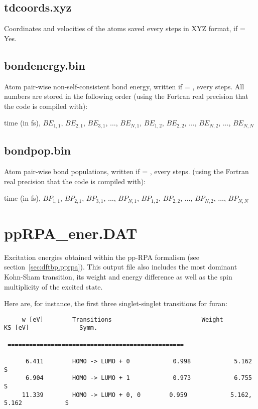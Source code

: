 \subsection{tdcoords.xyz}

Coordinates and velocities of the atoms saved every
 steps in XYZ format, if  = Yes.

\subsection{bondenergy.bin}
\label{sec:beformatout}

Atom pair-wise non-self-consistent bond energy, written if 
= , every  steps. All numbers are stored in the
following order (using the Fortran real precision that the code is compiled
with):

time (in fs), $BE_{1,1}$, $BE_{2,1}$, $BE_{3,1}$, $\dots$, $BE_{N,1}$,
$BE_{1,2}$, $BE_{2,2}$, $\dots$, $BE_{N,2}$, $\dots$, $BE_{N,N}$

\subsection{bondpop.bin}
\label{sec:bpformatout}

Atom pair-wise bond populations, written if  = ,
every  steps. (using the Fortran real precision that the code
is compiled with):

time (in fs), $BP_{1,1}$, $BP_{2,1}$, $BP_{3,1}$, $\dots$, $BP_{N,1}$,
$BP_{1,2}$, $BP_{2,2}$, $\dots$, $BP_{N,2}$, $\dots$, $BP_{N,N}$


\section{ppRPA\_ener.DAT}
\label{sec:ppRPAout}

Excitation energies obtained within the pp-RPA formalism (see
section~\ref{sec:dftbp.pprpa}). This output file also includes the
most dominant Kohn-Sham transition, its weight and energy difference
as well as the spin multiplicity of the excited state.

Here are, for instance, the first three singlet-singlet transitions
for furan:

\begin{verbatim}
     w [eV]        Transitions                         Weight            KS [eV]              Symm.

 =================================================  

      6.411        HOMO -> LUMO + 0            0.998            5.162                     S
      6.904        HOMO -> LUMO + 1            0.973            6.755                     S
     11.339        HOMO -> LUMO + 0, 0        0.959            5.162,  5.162            S
\end{verbatim}  

